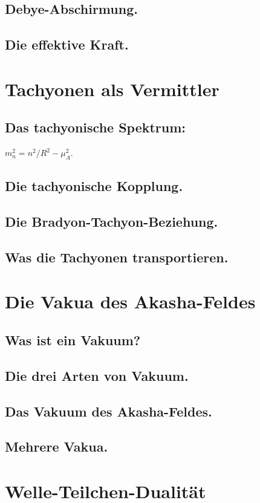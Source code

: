 \subsection{Debye-Abschirmung.}
\subsection{Die effektive Kraft.}

\section{Tachyonen als Vermittler}
\subsection{Das tachyonische Spektrum:} $m_n^2 = n^2/R^2 - \mu_A^2$.
\subsection{Die tachyonische Kopplung.}
\subsection{Die Bradyon-Tachyon-Beziehung.}
\subsection{Was die Tachyonen transportieren.}

\section{Die Vakua des Akasha-Feldes}
\subsection{Was ist ein Vakuum?}
\subsection{Die drei Arten von Vakuum.}
\subsection{Das Vakuum des Akasha-Feldes.}
\subsection{Mehrere Vakua.}

\section{Welle-Teilchen-Dualität}
